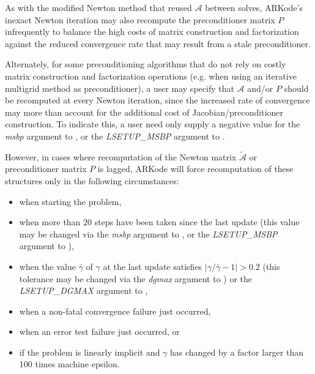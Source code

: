 \documentclass[letterpaper,10pt,english]{sphinxmanual}
\begin{document}
As with the modified Newton method that reused \({\mathcal A}\)
between solves, ARKode's inexact Newton iteration may also recompute the
preconditioner matrix \(P\) infrequently to balance the high costs
of matrix construction and factorization against the reduced
convergence rate that may result from a stale preconditioner.

Alternately, for some preconditioning algorithms that do not rely on
costly matrix construction and factorization operations (e.g. when
using an iterative multigrid method as preconditioner), a user may
specify that \({\mathcal A}\) and/or \(P\) should be
recomputed at every Newton iteration, since the increased rate of
convergence may more than account for the additional cost of
Jacobian/preconditioner construction.  To indicate this, a user need
only supply a negative value for the \emph{msbp} argument to
{\hyperref[c_interface/User_callable:c.ARKodeSetMaxStepsBetweenLSet]{\emph{}}}, or the \emph{LSETUP\_MSBP}
argument to {\hyperref[f_interface/Usage:f/_/FARKSETIIN]{\emph{}}}.

However, in cases where recomputation of the Newton matrix
\(\tilde{\mathcal A}\) or preconditioner matrix \(P\) is
lagged, ARKode will force recomputation of these structures only in
the following circumstances:
\begin{itemize}
\item {} 
when starting the problem,

\item {} 
when more than 20 steps have been taken since the last update (this
value may be changed via the \emph{msbp} argument to
{\hyperref[c_interface/User_callable:c.ARKodeSetMaxStepsBetweenLSet]{\emph{}}}, or the \emph{LSETUP\_MSBP}
argument to {\hyperref[f_interface/Usage:f/_/FARKSETIIN]{\emph{}}}),

\item {} 
when the value \(\bar{\gamma}\) of \(\gamma\) at the last
update satisfies \(\left|\gamma/\bar{\gamma} - 1\right| > 0.2\)
(this tolerance may be changed via the \emph{dgmax} argument to
{\hyperref[c_interface/User_callable:c.ARKodeSetDeltaGammaMax]{\emph{}}}) or the \emph{LSETUP\_DGMAX}
argument to {\hyperref[f_interface/Usage:f/_/FARKSETRIN]{\emph{}}},

\item {} 
when a non-fatal convergence failure just occurred,

\item {} 
when an error test failure just occurred, or

\item {} 
if the problem is linearly implicit and \(\gamma\) has
changed by a factor larger than 100 times machine epsilon.

\end{itemize}
\end{document}
